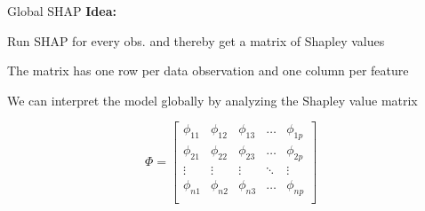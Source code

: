 \documentclass[10pt,compress,t,notes=noshow, xcolor=table]{beamer}
\begin{document}


\begin{framev}[align=top]{Global SHAP }
\textbf{Idea:}
\begin{itemizeM}
\item Run SHAP for every obs. and thereby get a matrix of Shapley values
\item The matrix has one row per data observation and one column per feature
\item We can interpret the model globally by analyzing the Shapley value matrix
\end{itemizeM}
\spacer[4.7]
$$
\Phi =
\begin{bmatrix}
\phi_{11} & \phi_{12} & \phi_{13} & \dots & \phi_{1p} \\
\phi_{21} & \phi_{22} & \phi_{23} & \dots & \phi_{2p} \\
\vdots & \vdots & \vdots & \ddots & \vdots \\
\phi_{n1} & \phi_{n2} & \phi_{n3} & \dots & \phi_{np} \\
\end{bmatrix}
$$
\end{framev}
\end{document}
